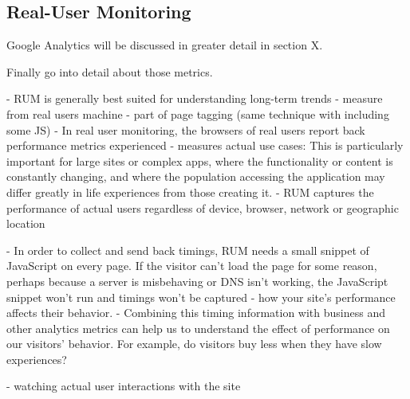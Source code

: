 \subsection{Real-User Monitoring}











Google Analytics will be discussed in greater detail in section X.




Finally go into detail about those metrics.










- RUM is generally best suited for understanding long-term trends
- measure from real users machine
- part of page tagging (same technique with including some JS)
- In real user monitoring, the browsers of real users report back performance metrics experienced
- measures actual use cases: This is particularly important for large sites or complex apps, where the functionality or content is constantly changing, and where the population accessing the application may differ greatly in life experiences from those creating it.
- RUM captures the performance of actual users regardless of device, browser, network or geographic location





- In order to collect and send back timings, RUM needs a small snippet of JavaScript on every page. If the visitor can’t load the page for some reason, perhaps because a server is misbehaving or DNS isn’t working, the JavaScript snippet won’t run and timings won’t be captured
- how your site’s performance affects their behavior.
- Combining this timing information with business and other analytics metrics can help us to understand the effect of performance on our visitors’ behavior. For example, do visitors buy less when they have slow experiences?






- watching actual user interactions with the site



